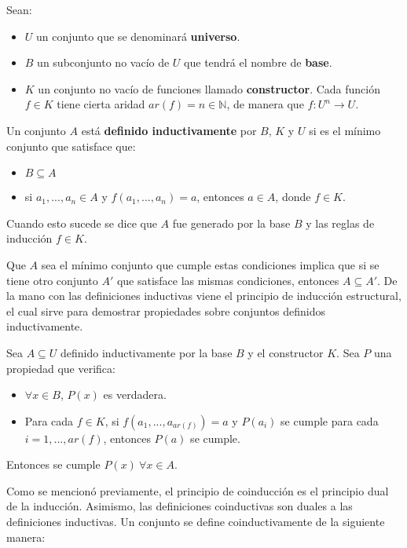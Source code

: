 \begin{definition}
Sean:
\begin{itemize}
\item $U$ un conjunto que se denominará \textbf{universo}.
\item $B$ un subconjunto no vacío de $U$ que tendrá el nombre de \textbf{base}. 
\item $K$ un conjunto no vacío de funciones llamado \textbf{constructor}. Cada función $f \in K$ tiene cierta aridad $ar(f) = n \in \mathbb{N}$, de manera que $f : U^n \rightarrow U$.
\end{itemize}
Un conjunto $A$ está \textbf{definido inductivamente} por $B$, $K$ y $U$ si es el mínimo conjunto que satisface que:
\begin{itemize}
\item $B \subseteq A$
\item si $a_1, ..., a_n \in A$ y $f(a_1, ..., a_n) = a$, entonces $a \in A$, donde $f \in K$. 
\end{itemize}
Cuando esto sucede se dice que $A$ fue generado por la base $B$ y las reglas de inducción $f \in K$. 
\end{definition}

Que $A$ sea el mínimo conjunto que cumple estas condiciones implica que si se tiene otro conjunto $A'$ que satisface las mismas condiciones, entonces $A \subseteq A'$.
De la mano con las definiciones inductivas viene el principio de inducción estructural, el cual sirve para demostrar propiedades sobre conjuntos definidos inductivamente. 

\begin{thm}
Sea $A \subseteq U$ definido inductivamente por la base $B$ y el constructor $K$. Sea $P$ una propiedad que verifica:
\begin{itemize}
\item $\forall x \in B$, $P(x)$ es verdadera.
\item Para cada $f \in K$, si $f(a_1, ..., a_{ar(f)}) = a$ y $P(a_i)$ se cumple para cada $i = 1, ..., ar(f)$, entonces $P(a)$ se cumple. 
\end{itemize}
Entonces se cumple $P(x) \ \forall x \in A$.
\end{thm}

Como se mencionó previamente, el principio de coinducción es el principio dual de la inducción. Asimismo, las definiciones coinductivas son duales a las definiciones inductivas. Un conjunto se define coinductivamente de la siguiente manera:


